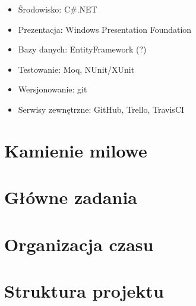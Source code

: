 \documentclass[a4paper]{article}
\begin{document}
	\begin{itemize}
		\item Środowisko: C\#.NET
		\item Prezentacja: Windows Presentation Foundation
		\item Bazy danych: EntityFramework (?)
		\item Testowanie: Moq, NUnit/XUnit
		\item Wersjonowanie: git
		\item Serwisy zewnętrzne: GitHub, Trello, TravisCI
	\end{itemize}
	
	\section{Kamienie milowe}	
	\section{Główne zadania}
	\section{Organizacja czasu}
	\section{Struktura projektu}
	
\end{document}
